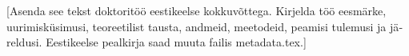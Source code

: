 \begin{otherlanguage}{estonian}
\begin{center}
\textbf{\ThesisTitleEstonian}
\end{center}
[Asenda see tekst doktoritöö eestikeelse kokkuvõttega. Kirjelda töö eesmärke,
uurimisküsimusi, teoreetilist tausta, andmeid, meetodeid, peamisi tulemusi ja
järeldusi. Eestikeelse pealkirja saad muuta failis metadata.tex.]
\end{otherlanguage}
